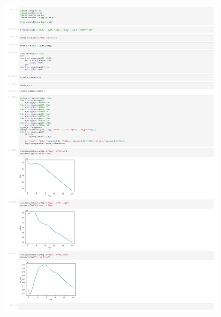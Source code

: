 \documentclass[addpoints, 11pt]{exam}
\begin{document}
\begin{questions}
\begin{figure}[H]
	\includegraphics[scale=0.4]{Math_142_Homework_3_Q_4.pdf}	
\end{figure}

\end{questions}
\end{document}
